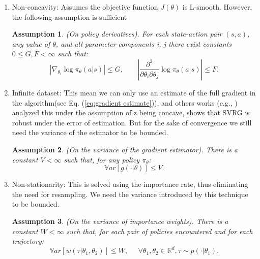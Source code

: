\begin{enumerate}
    \item Non-concavity: Assumes the objective function $J(\theta)$ is L-smooth. However, the following assumption is sufficient
    
    \newtheorem{assumption}{Assumption}
    \begin{assumption}\label{concavity}
    (On policy derivatives). For each state-action pair $(s, a)$, any value of $\theta$, and all parameter components i, j there exist constants $0 \leq G, F < \infty$ such that:
    $$|\nabla_{\theta_i} \log{\pi_\theta(a|s)}| \leq G, \;\;\;\;\;\;\; |\frac{\partial^2}{\partial\theta_i \partial\theta_j}\log{\pi_\theta(a|s)}|\leq F .$$
    
    \end{assumption}
    
    \item Infinite dataset: This mean we can only use an estimate of the full gradient in the algorithm(see Eq. (\ref{eq:gradient estimate})), and others works (e.g., \cite{babanezhad2015stopwasting})  analyzed this under the assumption of z being concave, shows that SVRG is robust under the error of estimation. But for the sake of convergence we still need the variance of the estimator to be bounded.
    
    \begin{assumption}\label{estimator}
    (On the variance of the gradient estimator). There is a constant $V < \infty$ such that, for any policy $\pi_\theta$:
    $$\mathbb{V}ar\left[g(\cdot|\theta)\right] \leq V.$$
    
    \end{assumption}
    
    
    \item Non-stationarity: This is solved using the importance rate, thus eliminating the need for resampling. We need the variance introduced by this technique to be bounded.
    
    \begin{assumption}\label{stationary}
    (On the variance of importance weights). There is a constant $W < \infty$ such that, for each pair of policies encountered and for each trajectory:
    $$\mathbb{V}ar\left[w(\tau|\theta_1, \theta_2)\right] \leq W, \;\;\;\;\; \forall \theta_1, \theta_2 \in \mathbb{R}^d, \tau \sim p(\cdot|\theta_1).$$
    \end{assumption}
    
\end{enumerate}

